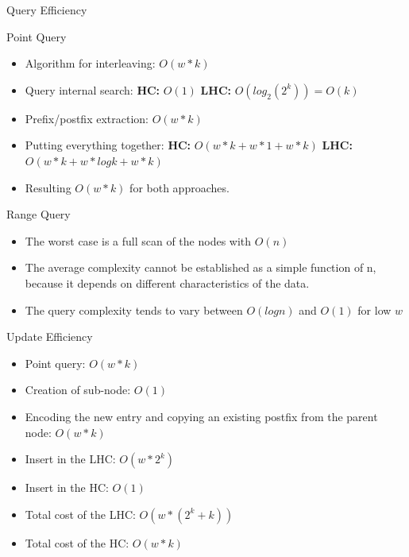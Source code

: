 \documentclass{beamer}
\begin{document}
\begin{frame}{Query Efficiency}
 \begin{block}{Point Query}
 \begin{itemize}
  \item Algorithm for interleaving: $O(w*k)$
  \item Query internal search: \textbf{HC:} $O(1)$ \textbf{LHC:} $O(log_{2}(2^{k})) = O(k)$
  \item Prefix/postfix extraction: $O(w*k)$
  \item Putting everything together: \textbf{HC:} $O(w*k + w*1 + w*k)$ \textbf{LHC:} $O(w*k + w * log k + w * k)$
  \item Resulting $O(w*k)$ for both approaches.
 \end{itemize}
 \end{block}
 
 \begin{block}{Range Query}
  \begin{itemize}
   \item The worst case is a full scan of the nodes with $O(n)$
  \end{itemize}
 \end{block}
 
 \begin{itemize}
  \item The average complexity cannot be established as a simple function of n, because it depends on different characteristics of the data.
  \item The query complexity tends to vary between $O(log n)$ and $O(1)$  for low $w$
 \end{itemize}
\end{frame}

\begin{frame}{Update Efficiency}
  \begin{itemize}
    \item Point query: $O(w * k)$
    \item Creation of sub-node: $O(1)$
    \item Encoding the new entry and copying an existing postfix from the parent node: $O(w*k)$
    \item Insert in the LHC: $O(w * 2^k)$
    \item Insert in the HC: $O(1)$
    \item Total cost of the LHC: $O(w * (2^k + k))$
    \item Total cost of the HC: $O(w * k)$
  \end{itemize}
\end{frame}
\end{document}
